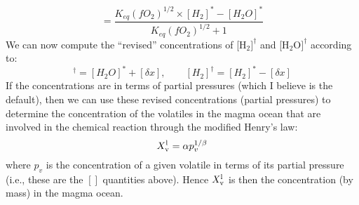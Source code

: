 \begin{equation}
[\delta x] = \frac{K_{eq} (fO_2)^{1/2} \times [H_2]^\ast - [H_2O]^\ast }{K_{eq} (fO_2)^{1/2} + 1}
\end{equation}
We can now compute the ``revised'' concentrations of [H$_2]^\dagger$ and [H$_2$O$]^\dagger$ according to:
\begin{equation}
[H_2O]^\dagger = [H_2O]^\ast + [\delta x], \qquad [H_2]^\dagger = [H_2]^\ast - [\delta x]
\end{equation}
If the concentrations are in terms of partial pressures (which I believe is the default), then we can use these revised concentrations (partial pressures) to determine the concentration of the volatiles in the magma ocean that are involved in the chemical reaction through the modified Henry's law:
\begin{equation}
X_{\rm v}^{\rm l} = \alpha p_v^{1/\beta} %
\label{eq:Henry_mod_invert}
\end{equation}
where $p_v$ is the concentration of a given volatile in terms of its partial pressure (i.e., these are the $[]$ quantities above).  Hence $X_{\rm v}^{\rm l}$ is then the concentration (by mass) in the magma ocean.  
